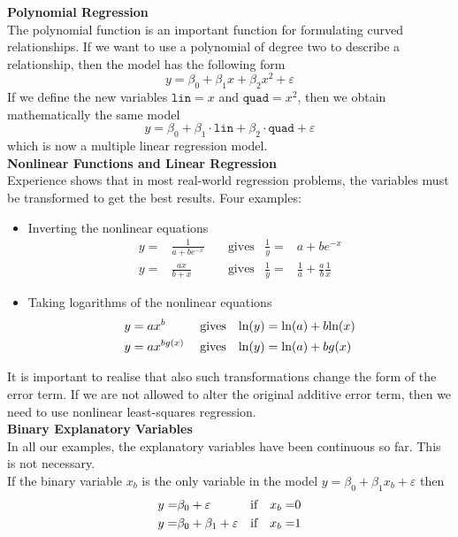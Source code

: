 \textbf{Polynomial Regression}\\
The polynomial function is an important function for formulating curved relationships. If we want to use a polynomial of degree two to describe a relationship, then the model has the following form
\begin{equation}
  y = \beta_0 + \beta_1x + \beta_2 x^2 + \varepsilon
\end{equation}
If we define the new variables $\texttt{lin} = x$ and $\texttt{quad} = x^2$, then we obtain mathematically the same model
\begin{equation}
  y = \beta_0 + \beta_1 \cdot \texttt{lin} + \beta_2 \cdot \texttt{quad} + \varepsilon
\end{equation}
which is now a multiple linear regression model.\\

\textbf{Nonlinear Functions and Linear Regression}\\
Experience shows that in most real-world regression problems, the variables must be transformed to get the best results. Four examples:
\begin{itemize}
  \item Inverting the nonlinear equations
  \begin{align*}
    y =& \frac{1}{a+be^{-x}}  &  \;&\text{gives} & \frac{1}{y} =& a + be^{-x}\\
    y =& \frac{ax}{b+x}       &  \;&\text{gives} & \frac{1}{y} =& \frac{1}{a} + \frac{a}{b} \frac{1}{x}
  \end{align*}
  \item Taking logarithms of the nonlinear equations
  \begin{align*}
    y &= ax^b       & \;&\text{gives} & \textup{ln}(y) &= \textup{ln}(a) + b\textup{ln}(x)\\
    y &= ax^{bg(x)} & \;&\text{gives} & \textup{ln}(y) &= \textup{ln}(a) + bg(x)
  \end{align*}
\end{itemize}
It is important to realise that also such transformations change the form of the error term. If we are not allowed to alter the original additive error term, then we need to use nonlinear least-squares regression.\\

\textbf{Binary Explanatory Variables}\\
In all our examples, the explanatory variables have been continuous so far. This is not necessary.\\
If the binary variable $x_b$ is the only variable in the model $y = \beta_0 + \beta_1 x_b + \varepsilon$ then
\begin{align*}
  y =& \beta_0 + \varepsilon           & \textup{if}& & x_b =& 0\\
  y =& \beta_0 + \beta_1 + \varepsilon & \textup{if}& & x_b =& 1
\end{align*}

